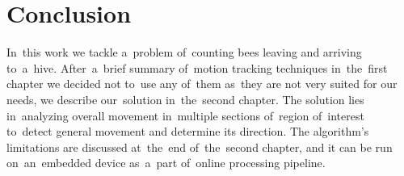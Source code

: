 \chapter*{Conclusion}
{}

In~this work we tackle a~problem of~counting bees leaving and arriving to~a~hive. After~a~brief summary of~motion tracking techniques in~the~first chapter we decided not to~use any of~them as~they are not very suited for our needs, we describe our~solution in~the~second chapter. The solution lies in~analyzing overall movement in~multiple sections of~region of~interest to~detect general movement and determine its direction. The algorithm's limitations are discussed at~the~end of~the~second chapter, and it can be run on~an~embedded device as~a~part of~online processing pipeline.